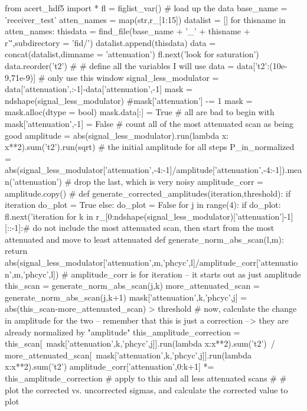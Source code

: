 \begin{python}
from acert_hdf5 import *
fl = figlist_var()
#{{{ load up the data
base_name = 'receiver_test'
atten_names = map(str,r_[1:15])
datalist = []
for thisname in atten_names:
    thisdata = find_file(base_name + '_' + thisname + r'\.',subdirectory = 'fid/')
    datalist.append(thisdata)
data = concat(datalist,dimname = 'attenuation')
fl.next('look for saturation')
data.reorder('t2')
#}}}
#{{{ define all the variables I will use
data = data['t2':(10e-9,71e-9)] # only use this window
signal_less_modulator = data['attenuation',:-1]-data['attenuation',-1]
mask = ndshape(signal_less_modulator)
#mask['attenuation'] -= 1
mask = mask.alloc(dtype = bool)
mask.data[:] = True # all are bad to begin with
mask['attenuation',-1] = False # count all of the most attenuated scan as being good
amplitude = abs(signal_less_modulator).run(lambda x: x**2).sum('t2').run(sqrt) # the initial amplitude for all steps
P_in_normalized = abs(signal_less_modulator['attenuation',-4:-1]/amplitude['attenuation',-4:-1]).mean('attenuation') # drop the last, which is very noisy
amplitude_corr = amplitude.copy()
#}}}
def generate_corrected_amplitudes(iteration,threshold):
    if iteration %
        do_plot = True
    else:
        do_plot = False
    for j in range(4):
        if do_plot: fl.next('iteration %
        for k in r_[0:ndshape(signal_less_modulator)['attenuation']-1][::-1]:# do not include the most attenuated scan, then start from the most attenuated and move to least attenuated
            def generate_norm_abs_scan(l,m):
                return abs(signal_less_modulator['attenuation',m,'phcyc',l]/amplitude_corr['attenuation',m,'phcyc',l]) # amplitude_corr is for iteration -- it starts out as just amplitude
            this_scan = generate_norm_abs_scan(j,k)
            more_attenuated_scan = generate_norm_abs_scan(j,k+1)
            mask['attenuation',k,'phcyc',j] = abs(this_scan-more_attenuated_scan) > threshold
            #{{{ now, calculate the change in amplitude for the two -- remember that this is just a correction --> they are already normalized by "amplitude"
            this_amplitude_correction = this_scan[~mask['attenuation',k,'phcyc',j]].run(lambda x:x**2).sum('t2')\
                    / more_attenuated_scan[~mask['attenuation',k,'phcyc',j]].run(lambda x:x**2).sum('t2')
            amplitude_corr['attenuation',0:k+1] *= this_amplitude_correction # apply to this and all less attenuated scans
            #}}}
        #{{{ plot the corrected vs. uncorrected sigmas, and calculate the corrected value to plot
}}}
\end{python}
